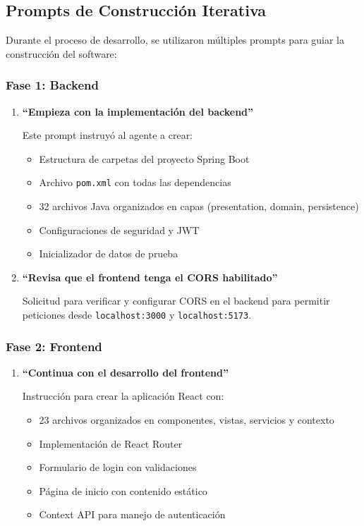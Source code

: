\documentclass[11pt,a4paper]{article}
\begin{document}
\subsection{Prompts de Construcción Iterativa}

Durante el proceso de desarrollo, se utilizaron múltiples prompts para guiar la construcción del software:

\subsubsection{Fase 1: Backend}

\begin{enumerate}
    \item \textbf{``Empieza con la implementación del backend''}
    
    Este prompt instruyó al agente a crear:
    \begin{itemize}
        \item Estructura de carpetas del proyecto Spring Boot
        \item Archivo \texttt{pom.xml} con todas las dependencias
        \item 32 archivos Java organizados en capas (presentation, domain, persistence)
        \item Configuraciones de seguridad y JWT
        \item Inicializador de datos de prueba
    \end{itemize}
    
    \item \textbf{``Revisa que el frontend tenga el CORS habilitado''}
    
    Solicitud para verificar y configurar CORS en el backend para permitir peticiones desde \texttt{localhost:3000} y \texttt{localhost:5173}.
\end{enumerate}

\subsubsection{Fase 2: Frontend}

\begin{enumerate}
    \item \textbf{``Continua con el desarrollo del frontend''}
    
    Instrucción para crear la aplicación React con:
    \begin{itemize}
        \item 23 archivos organizados en componentes, vistas, servicios y contexto
        \item Implementación de React Router
        \item Formulario de login con validaciones
        \item Página de inicio con contenido estático
        \item Context API para manejo de autenticación
    \end{itemize}
\end{enumerate}
\end{document}
